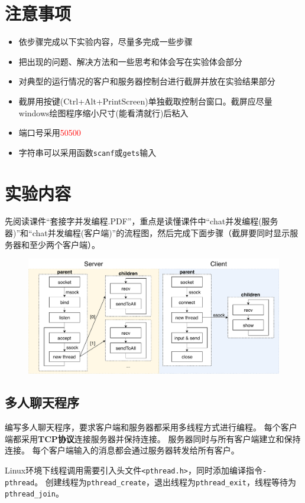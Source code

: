 \documentclass[logo,reportComp]{thesis}
\begin{document}
\section{注意事项}
\begin{itemize}
    \item 依步骤完成以下实验内容，尽量多完成一些步骤
    \item 把出现的问题、解决方法和一些思考和体会写在实验体会部分
    \item 对典型的运行情况的客户和服务器控制台进行截屏并放在实验结果部分
    \item 截屏用按键(Ctrl+Alt+PrintScreen)单独截取控制台窗口。截屏应尽量windows绘图程序缩小尺寸(能看清就行)后粘入
    \item 端口号采用\textcolor{red}{50500}
    \item 字符串可以采用函数\verb'scanf'或\verb'gets'输入
\end{itemize}

\section{实验内容}
先阅读课件``套接字并发编程.PDF''，重点是读懂课件中``chat并发编程(服务器)''和``chat并发编程(客户端)''的流程图，然后完成下面步骤（截屏要同时显示服务器和至少两个客户端）。
\begin{figure}[H]
\centering
\includegraphics[width=\linewidth]{fig/socket-multithread.pdf}
\end{figure}

\subsection{多人聊天程序}
编写多人聊天程序，要求客户端和服务器都采用多线程方式进行编程。
每个客户端都采用\textbf{TCP协议}连接服务器并保持连接。
服务器同时与所有客户端建立和保持连接。
每个客户端输入的消息都会通过服务器转发给所有客户。

Linux环境下线程调用需要引入头文件\verb'<pthread.h>'，同时添加编译指令\verb'-pthread'。
创建线程为\verb'pthread_create'，退出线程为\verb'pthread_exit'，线程等待为\verb'pthread_join'。
\end{document}

